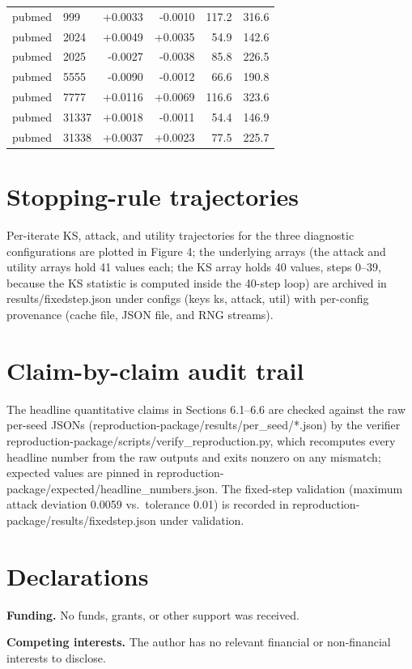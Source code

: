 \documentclass[pdflatex,sn-basic,Numbered]{sn-jnl}
\begin{document}
\begin{table}[htbp]
\begin{tabular}{llrrrr}
pubmed & 999 & +0.0033 & -0.0010 & 117.2 & 316.6\\
pubmed & 2024 & +0.0049 & +0.0035 & 54.9 & 142.6\\
pubmed & 2025 & -0.0027 & -0.0038 & 85.8 & 226.5\\
pubmed & 5555 & -0.0090 & -0.0012 & 66.6 & 190.8\\
pubmed & 7777 & +0.0116 & +0.0069 & 116.6 & 323.6\\
pubmed & 31337 & +0.0018 & -0.0011 & 54.4 & 146.9\\
pubmed & 31338 & +0.0037 & +0.0023 & 77.5 & 225.7\\\bottomrule
\end{tabular}\end{table}

\section{Stopping-rule trajectories}
Per-iterate KS, attack, and utility trajectories for the three diagnostic configurations are plotted in Figure 4; the underlying arrays (the attack and utility arrays hold 41 values each; the KS array holds 40 values, steps 0--39, because the KS statistic is computed inside the 40-step loop) are archived in results/fixedstep.json under configs (keys ks, attack, util) with per-config provenance (cache file, JSON file, and RNG streams).

\section{Claim-by-claim audit trail}
The headline quantitative claims in Sections 6.1--6.6 are checked against the raw per-seed JSONs (reproduction-package/results/per\_seed/*.json) by the verifier reproduction-package/scripts/verify\_reproduction.py, which recomputes every headline number from the raw outputs and exits nonzero on any mismatch; expected values are pinned in reproduction-package/expected/headline\_numbers.json. The fixed-step validation (maximum attack deviation 0.0059 vs.\ tolerance 0.01) is recorded in reproduction-package/results/fixedstep.json under validation.

\section*{Declarations}
\textbf{Funding.} No funds, grants, or other support was received.

\textbf{Competing interests.} The author has no relevant financial or non-financial interests to disclose.
\end{document}
